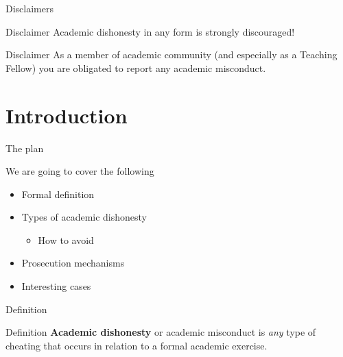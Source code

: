 
\begin{frame}{Disclaimers}
	
	\begin{alertblock}{Disclaimer}
		Academic dishonesty in any form is strongly discouraged!
	\end{alertblock}

	\begin{alertblock}{Disclaimer}
		As a member of academic community (and especially as a Teaching Fellow) you are obligated to report any academic misconduct.
	\end{alertblock}

\end{frame}

\section{Introduction}

	\begin{frame}{The plan}
		
		We are going to cover the following

		\begin{itemize}
			\item
				Formal definition
			\item 
				Types of academic dishonesty
				\begin{itemize}
					\item 
						How to avoid
				\end{itemize}
			\item 
				Prosecution mechanisms
			\item
				Interesting cases
		\end{itemize}

	\end{frame}

	\begin{frame}{Definition}
		
		\begin{block}{Definition}
			\textbf{Academic dishonesty} or academic misconduct is \emph{any} type of cheating that occurs in relation to a formal academic exercise.
		\end{block}	

	\end{frame}

